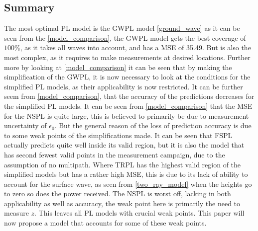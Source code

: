 \subsection*{Summary}
The most optimal PL model is the GWPL model \eqref{ground_wave} as it can be seen from the  \autoref{model_comparison}, the GWPL model gets the best coverage of $100\%$, as it takes all waves into account, and has a MSE of 35.49. But is also the most complex, as it requires to make measurements at desired locations. Further more by looking at \autoref{model_comparison} it can be seen that by making the simplification of the GWPL, it is now necessary to look at the conditions for the simplified PL models, as their applicability is now restricted. It can be further seem from \autoref{model_comparison}, that the accuracy of the predictions decreases for the simplified PL models.
It can be seen from \autoref{model_comparison} that the MSE for the NSPL is quite large, this is believed to primarily be due to measurement uncertainty of $\epsilon_{0}$.  
But the general reason of the loss of prediction accuracy is due to some weak points of the simplifications made. It can be seen that FSPL actually predicts quite well inside its valid region, but it is also the model that has second fewest valid points in the measurement campaign, due to the assumption of no multipath. Where TRPL has the highest valid region of the simplified models but has a rather high MSE, this is due to its lack of ability to account for the surface wave, as seen from \eqref{two_ray_model} when the heights go to zero so does the power received. The NSPL is worst off, lacking in both applicability as well as accuracy, the weak point here is primarily the need to measure $z$. This leaves all PL models with crucial weak points. This paper will now propose a model that accounts for some of these weak points. 





